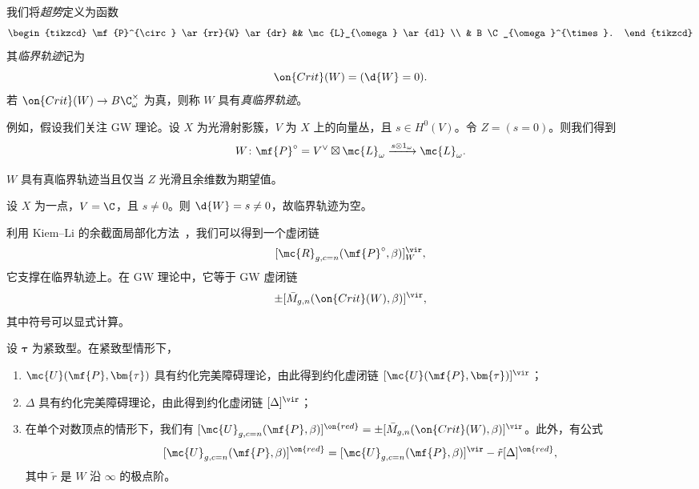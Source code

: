 我们将\textit{超势}定义为函数
\begin{equation*}
\begin{tikzcd}
    \mf{P}^{\circ} \ar{rr}{W} \ar{dr} && \mc{L}_{\omega} \ar{dl} \\
    & B \C_{\omega}^{\times}.
\end{tikzcd}
\end{equation*}
其\textit{临界轨迹}记为
\[ \on{Crit}(W) = (\d{W} = 0). \]
若 \(\on{Crit}(W) \to B\C_{\omega}^{\times}\) 为真，则称 \(W\) 具有\textit{真临界轨迹}。

例如，假设我们关注 GW 理论。设 \(X\) 为光滑射影簇，\(V\) 为 \(X\) 上的向量丛，且 \(s \in H^0(V)\)。令 \(Z = (s = 0)\)。则我们得到
\[ W \colon \mf{P}^{\circ} = V^{\vee} \boxtimes \mc{L}_{\omega} \xrightarrow{s \otimes 1_{\omega}} \mc{L}_{\omega}. \]

\begin{lem}
    \(W\) 具有真临界轨迹当且仅当 \(Z\) 光滑且余维数为期望值。
\end{lem}

\begin{exm}
    设 \(X\) 为一点，\(V = \C\)，且 \(s \neq 0\)。则 \(\d{W} = s \neq 0\)，故临界轨迹为空。
\end{exm}

利用 Kiem--Li 的余截面局部化方法~\cite{KiemLi2013}，我们可以得到一个虚闭链
\[ [\mc{R}_{g, c=n}(\mf{P}^{\circ}, \beta)]_W^{\vir}, \]
它支撑在临界轨迹上。在 GW 理论中，它等于 GW 虚闭链
\[ \pm [\bar{M}_{g,n}(\on{Crit}(W), \beta)]^{\vir}, \]
其中符号可以显式计算。

\begin{thm}
    设 \(\bm{\tau}\) 为紧致型。在紧致型情形下，
    \begin{enumerate}
        \item \(\mc{U}(\mf{P}, \bm{\tau})\) 具有约化完美障碍理论，由此得到约化虚闭链 \([\mc{U}(\mf{P}, \bm{\tau})]^{\vir}\)；
        \item \(\Delta\) 具有约化完美障碍理论，由此得到约化虚闭链 \([\Delta]^{\vir}\)；
        \item 在单个对数顶点的情形下，我们有 \([\mc{U}_{g, c=n}(\mf{P}, \beta)]^{\on{red}} = \pm [\bar{M}_{g,n}(\on{Crit}(W), \beta)]^{\vir}\)。此外，有公式
            \[ [\mc{U}_{g, c=n}(\mf{P}, \beta)]^{\on{red}} = [\mc{U}_{g, c=n}(\mf{P}, \beta)]^{\vir} - \tilde{r} [\Delta]^{\on{red}}, \]
            其中 \(\tilde{r}\) 是 \(W\) 沿 \(\infty\) 的极点阶。
    \end{enumerate}
\end{thm}

